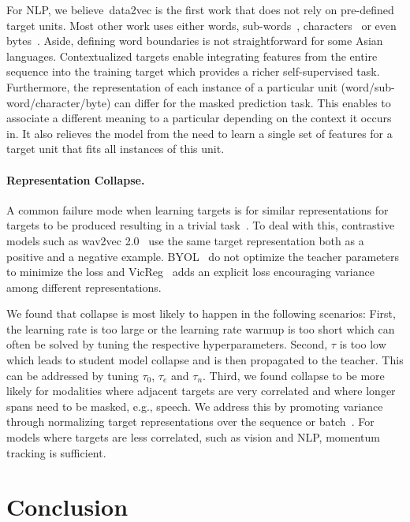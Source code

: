 \documentclass[nohyperref]{article}
\theoremstyle{plain}
\theoremstyle{definition}
\theoremstyle{remark}
\newcommand{\name}{data2vec}
\begin{document}
For NLP, we believe~\name{} is the first work that does not rely on pre-defined target units.
Most other work uses either words, sub-words~\citep{radford2018unsup,devlin2018bert}, characters~\citep{tay2021charformer} or even bytes~\citep{xue2021byt5}.
Aside, defining word boundaries is not straightforward for some  Asian languages.
Contextualized targets enable integrating features from the entire sequence into the training target which provides a richer self-supervised task. 
Furthermore, the representation of each instance of a particular unit (word/sub-word/character/byte) can differ for the masked prediction task.
This enables to associate a different meaning to a particular depending on the context it occurs in.
It also relieves the model from the need to learn a single set of features for a target unit that fits all instances of this unit.

\paragraph{Representation Collapse.}
A common failure mode when learning targets is for similar representations for targets to be produced resulting in a trivial task~\citep{jing2021understanding}.
To deal with this, contrastive models such as wav2vec 2.0~\citep{baevski2020wav} use the same target representation both as a positive and a negative example.
BYOL~\citep{grill2020byol} do not optimize the teacher parameters to minimize the loss and VicReg~\citep{bardes2021vicreg} adds an explicit loss encouraging variance among different representations.

We found that collapse is most likely to happen in the following scenarios: 
First, the learning rate is too large or the learning rate warmup is too short which can often be solved by tuning the respective hyperparameters.
Second, $\tau$ is too low which leads to student model collapse and is then propagated to the teacher. 
This can be addressed by tuning $\tau_0$, $\tau_e$ and $\tau_n$.
Third, we found collapse to be more likely for modalities where adjacent targets are very correlated and where longer spans need to be masked, e.g., speech.
We address this by promoting variance through normalizing target representations over the sequence or batch~\citep{grill2020byol}.
For models where targets are less correlated, such as vision and NLP, momentum tracking is sufficient. 



\section{Conclusion}
\end{document}
